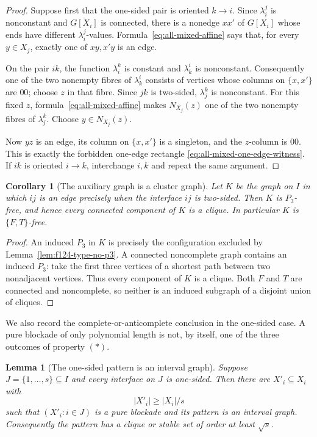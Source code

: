 \documentclass[11pt]{article}
\numberwithin{equation}{section}
\theoremstyle{plain}
\newtheorem{lemma}[theorem]{Lemma}
\newtheorem{corollary}[theorem]{Corollary}
\theoremstyle{definition}
\begin{document}
\begin{proof}
Suppose first that the one-sided pair is oriented $k\to i$.  Since
$\lambda_i^j$ is nonconstant and $\overline{G[X_i]}$ is connected,
there is a nonedge $xx'$ of $G[X_i]$ whose ends have different
$\lambda_i^j$-values.  Formula~\eqref{eq:all-mixed-affine} says that,
for every $y\in X_j$,
exactly one of $xy,x'y$ is an edge.

On the pair $ik$, the function $\lambda_i^k$ is constant and
$\lambda_k^i$ is nonconstant.  Consequently one of the two nonempty
fibres of $\lambda_k^i$ consists of vertices whose columns on
$\{x,x'\}$ are $00$; choose $z$ in that fibre.  Since $jk$ is two-sided,
$\lambda_j^k$ is nonconstant.  For this fixed $z$,
formula~\eqref{eq:all-mixed-affine} makes
$N_{X_j}(z)$ one of the two nonempty fibres of $\lambda_j^k$.  Choose
$y\in N_{X_j}(z)$.

Now $yz$ is an edge, its column on $\{x,x'\}$ is a singleton, and the
$z$-column is $00$.  This is exactly the forbidden one-edge rectangle
\eqref{eq:all-mixed-one-edge-witness}.  If $ik$ is oriented $i\to k$,
interchange $i,k$ and repeat the
same argument.
\end{proof}

\begin{corollary}[The auxiliary graph is a cluster graph]
\label{cor:f124-type-cluster}
Let $K$ be the graph on $I$ in which $ij$ is an edge precisely when the
interface $ij$ is two-sided.  Then $K$ is $P_3$-free, and hence every
connected component of $K$ is a clique.  In particular $K$ is
$\{F,T\}$-free.
\end{corollary}

\begin{proof}
An induced $P_3$ in $K$ is precisely the configuration excluded by
Lemma~\ref{lem:f124-type-no-p3}.  A connected noncomplete graph contains
an induced $P_3$: take the first three vertices of a shortest path
between two nonadjacent vertices.  Thus every component of $K$ is a
clique.  Both $F$ and $T$ are connected and noncomplete, so neither
is an induced subgraph of a disjoint union of cliques.
\end{proof}

We also record the complete-or-anticomplete conclusion in the one-sided
case.  A pure blockade of only polynomial length is not, by itself, one
of the three outcomes of property $(*)$.

\begin{lemma}[The one-sided pattern is an interval graph]
\label{lem:f124-one-sided-interval}
Suppose $J=\{1,\ldots,s\}\subseteq I$ and every interface on $J$ is
one-sided.  Then there are $X'_i\subseteq X_i$ with
\begin{equation}
                         |X'_i|\geq |X_i|/s
 \label{eq:one-sided-cell-size}
\end{equation}
such that $(X'_i:i\in J)$ is a pure blockade and its pattern is an
interval graph.  Consequently the pattern has a clique or stable set
of order at least $\sqrt{s}$.
\end{lemma}
\end{document}

